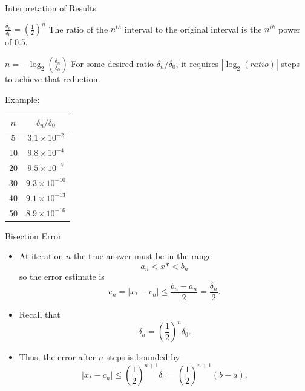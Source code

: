 \documentclass[10pt]{beamer}
\begin{document}
\begin{frame}{Interpretation of Results}

\begin{block}{$\frac{\delta_n}{\delta_0} = \left( \frac{1}{2} \right)^n$}
    The ratio of the $n^{th}$ interval to the original interval is the $n^{th}$ power of 0.5.
\end{block}

\begin{block}{$n = -\log_2 \left( \frac{\delta_n}{\delta_0} \right)$}
    For some desired ratio $\delta_n/\delta_0$, it requires $|\log_2(ratio)|$ steps to achieve that reduction. 
\end{block}


\begin{center}
Example:
\renewcommand{\arraystretch}{1.3}
\begin{tabular}{c|c}
  \(n\) & \(\delta_n/\delta_0\) \\ \hline
   5   & \(3.1\times10^{-2}\) \\
  10   & \(9.8\times10^{-4}\) \\
  20   & \(9.5\times10^{-7}\) \\
  30   & \(9.3\times10^{-10}\) \\
  40   & \(9.1\times10^{-13}\) \\
  50   & \(8.9\times10^{-16}\)
\end{tabular}
\end{center}

\end{frame}
\begin{frame}{Bisection Error}
\begin{itemize}
    \item At iteration \(n\) the true answer must be in the range
    $$
        a_n < x* < b_n
    $$
    so the error estimate is
    \[
        e_n = |x_* - c_n| \leq \frac{b_n - a_n}{2} = \frac{\delta_n}{2}.
    \]
    \item Recall that
    \[
        \delta_n = \left( \frac{1}{2} \right)^n \delta_0.
    \]
    \item Thus, the error after \(n\) steps is bounded by
    \[
        |x_* - c_n| \leq \left(\frac{1}{2}\right)^{n+1}\delta_0 
        = \left(\frac{1}{2}\right)^{n+1}(b - a).
    \]
\end{itemize}
\end{frame}
\end{document}
